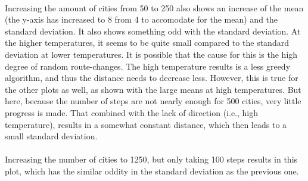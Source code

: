 \documentclass[10pt,a4paper]{article}
\begin{document}
 \\
Increasing the amount of cities from 50 to 250 also shows an increase of the mean (the y-axis has increased to 8 from 4 to accomodate for the mean) and the standard deviation. It also shows something odd with the standard deviation. At the higher temperatures, it seems to be quite small compared to the standard deviation at lower temperatures. It is possible that the cause for this is the high degree of random route-changes. The high temperature results is a less greedy algorithm, and thus the distance needs to decrease less. However, this is true for the other plots as well, as shown with the large means at high temperatures. But here, because the number of steps are not nearly enough for 500 cities, very little progress is made. That combined with the lack of direction (i.e., high temperature), results in a somewhat constant distance, which then leads to a small standard deviation.\\

 \\
Increasing the number of cities to 1250, but only taking 100 steps results in this plot, which has the similar oddity in the standard deviation as the previous one.\\
\end{document}
